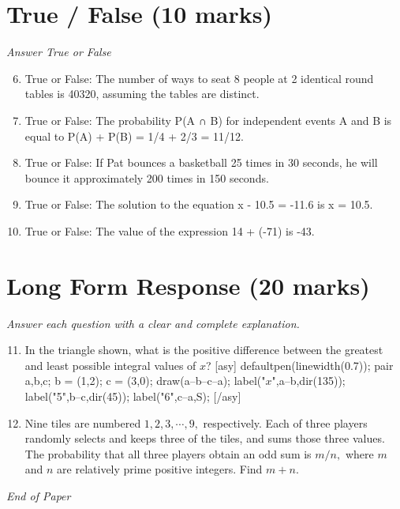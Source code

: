 \documentclass[12pt]{article}
\begin{document}
\section*{True / False (10 marks)}
\textit{Answer True or False}
\begin{enumerate}[label=\arabic*.]
\setcounter{enumi}{5}
\item True or False: The number of ways to seat 8 people at 2 identical round tables is 40320, assuming the tables are distinct.
\item True or False: The probability P(A ∩ B) for independent events A and B is equal to P(A) + P(B) = 1/4 + 2/3 = 11/12.
\item True or False: If Pat bounces a basketball 25 times in 30 seconds, he will bounce it approximately 200 times in 150 seconds.
\item True or False: The solution to the equation x - 10.5 = -11.6 is x = 10.5.
\item True or False: The value of the expression 14 + (-71) is -43.
\end{enumerate}

\section*{Long Form Response (20 marks)}
\textit{Answer each question with a clear and complete explanation.}
\begin{enumerate}[label=\arabic*.]
\setcounter{enumi}{10}
\item In the triangle shown, what is the positive difference between the greatest and least possible integral values of $x$? [asy] defaultpen(linewidth(0.7)); pair a,b,c; b = (1,2); c = (3,0); draw(a--b--c--a); label("$x$",a--b,dir(135)); label("5",b--c,dir(45)); label("6",c--a,S); [/asy]
\item Nine tiles are numbered $1, 2, 3, \cdots, 9,$ respectively. Each of three players randomly selects and keeps three of the tiles, and sums those three values. The probability that all three players obtain an odd sum is $m/n,$ where $m$ and $n$ are relatively prime positive integers. Find $m+n.$
\end{enumerate}

\vfill
\noindent\textit{End of Paper}
\end{document}
